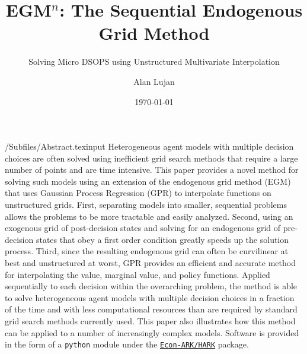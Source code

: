\documentclass[SequentialEGM]{subfiles}
\begin{document}

\title{EGM$^n$: The Sequential Endogenous Grid Method}
\subtitle{Solving Micro DSOPS using Unstructured Multivariate Interpolation}

\author{Alan Lujan\authNum}



\date{\today}

\maketitle

\hypertarget{abstract}{}
\begin{verbatimwrite}{\econtexRoot/Subfiles/Abstract.texinput}
	Heterogeneous agent models with multiple decision choices are often solved using inefficient grid search methods that require a large number of points and are time intensive.
	This paper provides a novel method for solving such models using an extension of the endogenous grid method (EGM) that uses Gaussian Process Regression (GPR) to interpolate functions on unstructured grids.
	First, separating models into smaller, sequential problems allows the problems to be more tractable and easily analyzed.
	Second, using an exogenous grid of post-decision states and solving for an endogenous grid of pre-decision states that obey a first order condition greatly speeds up the solution process.
	Third, since the resulting endogenous grid can often be curvilinear at best and unstructured at worst, GPR provides an efficient and accurate method for interpolating the value, marginal value, and policy functions.
	Applied sequentially to each decision within the overarching problem, the method is able to solve heterogeneous agent models with multiple decision choices in a fraction of the time and with less computational resources than are required by standard grid search methods currently used.
	This paper also illustrates how this method can be applied to a number of increasingly complex models. Software is provided in the form of a \texttt{python} module under the \href{https://econ-ark/HARK}{\texttt{Econ-ARK/HARK}} package.
\end{verbatimwrite}

\end{document}

